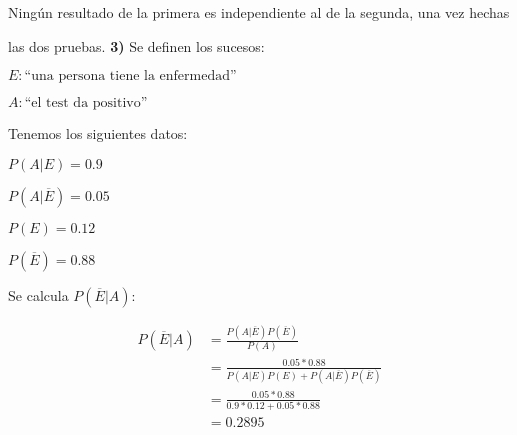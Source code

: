 \documentclass[12pt]{article}
\begin{document}
Ningún resultado de la primera es independiente al de la segunda, una vez hechas

las dos pruebas.
\newpage
\textbf{3)}
Se definen los sucesos:

$E: \textrm{``una persona tiene la enfermedad''}$

$A: \textrm{``el test da positivo''}$

Tenemos los siguientes datos:

$P(A|E)=0.9$

$P(A|\overline{E})=0.05$

$P(E)=0.12$

$P(\overline{E})=0.88$

Se calcula $P(\overline{E}|A)$:

\begin{align*}
  P(\overline{E}|A)&=\frac{P(A|\overline{E})P(\overline{E})}{P(A)}\tag{Teorema de Bayes}\\
                   &=\frac{0.05*0.88}{P(A|E)P(E)+P(A|\overline{E})P(\overline{E})}\\
                   &=\frac{0.05*0.88}{0.9*0.12+0.05*0.88}\\
                   &=0.2895
\end{align*}
\end{document}
